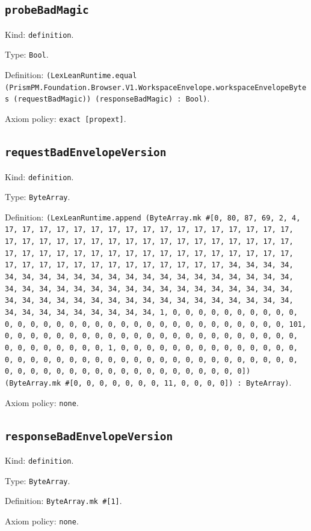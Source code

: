 \documentclass[11pt]{article}
\begin{document}
\subsection*{\texttt{probeBadMagic}}
\noindent Kind: \texttt{definition}.\par
\noindent Type: \texttt{Bool}.\par
\noindent Definition: \texttt{(LexLeanRuntime.equal (PrismPM.Foundation.Browser.V1.WorkspaceEnvelope.workspaceEnvelopeBytes (requestBadMagic)) (responseBadMagic) : Bool)}.\par
\noindent Axiom policy: \texttt{exact [propext]}.\par
\subsection*{\texttt{requestBadEnvelopeVersion}}
\noindent Kind: \texttt{definition}.\par
\noindent Type: \texttt{ByteArray}.\par
\noindent Definition: \texttt{(LexLeanRuntime.append (ByteArray.mk \#[0, 80, 87, 69, 2, 4, 17, 17, 17, 17, 17, 17, 17, 17, 17, 17, 17, 17, 17, 17, 17, 17, 17, 17, 17, 17, 17, 17, 17, 17, 17, 17, 17, 17, 17, 17, 17, 17, 17, 17, 17, 17, 17, 17, 17, 17, 17, 17, 17, 17, 17, 17, 17, 17, 17, 17, 17, 17, 17, 17, 17, 17, 17, 17, 17, 17, 17, 17, 17, 17, 34, 34, 34, 34, 34, 34, 34, 34, 34, 34, 34, 34, 34, 34, 34, 34, 34, 34, 34, 34, 34, 34, 34, 34, 34, 34, 34, 34, 34, 34, 34, 34, 34, 34, 34, 34, 34, 34, 34, 34, 34, 34, 34, 34, 34, 34, 34, 34, 34, 34, 34, 34, 34, 34, 34, 34, 34, 34, 34, 34, 34, 34, 34, 34, 1, 0, 0, 0, 0, 0, 0, 0, 0, 0, 0, 0, 0, 0, 0, 0, 0, 0, 0, 0, 0, 0, 0, 0, 0, 0, 0, 0, 0, 0, 0, 0, 0, 101, 0, 0, 0, 0, 0, 0, 0, 0, 0, 0, 0, 0, 0, 0, 0, 0, 0, 0, 0, 0, 0, 0, 0, 0, 0, 0, 0, 0, 0, 0, 0, 1, 0, 0, 0, 0, 0, 0, 0, 0, 0, 0, 0, 0, 0, 0, 0, 0, 0, 0, 0, 0, 0, 0, 0, 0, 0, 0, 0, 0, 0, 0, 0, 0, 0, 0, 0, 0, 0, 0, 0, 0, 0, 0, 0, 0, 0, 0, 0, 0, 0, 0, 0, 0, 0, 0, 0, 0]) (ByteArray.mk \#[0, 0, 0, 0, 0, 0, 0, 11, 0, 0, 0, 0]) : ByteArray)}.\par
\noindent Axiom policy: \texttt{none}.\par
\subsection*{\texttt{responseBadEnvelopeVersion}}
\noindent Kind: \texttt{definition}.\par
\noindent Type: \texttt{ByteArray}.\par
\noindent Definition: \texttt{ByteArray.mk \#[1]}.\par
\noindent Axiom policy: \texttt{none}.\par
\end{document}
